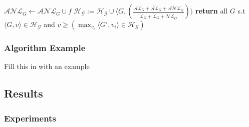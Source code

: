 \documentclass{beamer}
\newcommand{\todo}[1]{ {\color{red} #1} }
\begin{document}
\begin{frame}[c]
\begin{algorithmic}[1]
{							\State $\mathcal{ANL}_{G} \gets \mathcal{ANL}_{G} \cup f$ \label{alg:RecognizeIncompleteDomains:AchievedOverlookedLandmarks}
						\EndIf
					\EndFor
				\EndFor
				\State $\mathcal{H}_{\mathcal{G}} := \mathcal{H}_{\mathcal{G}} \cup \langle G,\left(\frac{\mathcal{AL}_{G} + \mathcal{\widetilde{AL}}_{G} + \mathcal{ANL}_{G}}{\mathcal{L}_{G} + \mathcal{\widetilde{L}}_{G} + \mathcal{NL}_{G}}\right)\rangle$  \label{alg:RecognizeIncompleteDomains:Heuristic}
			\EndFor
			\State \textbf{return} {all $G$ s.t $\langle G, v \rangle \in \mathcal{H}_{\mathcal{G}}$ and \newline \hspace*{\algorithmicindent}{\phantom{return }} $v \geq (\max_{v_i}{ \langle G',v_i \rangle \in \mathcal{H}_{\mathcal{G}}})$} \label{alg:RecognizeIncompleteDomains:Return}
	        \EndFunction
			}
	    \end{algorithmic}
\end{frame}

\begin{frame}[c]\frametitle{Algorithm Example}
	\todo{Fill this in with an example}
\end{frame}


\subsection{Results}

\begin{frame}[c]\frametitle{Experiments}
	
\end{frame}
\end{document}
